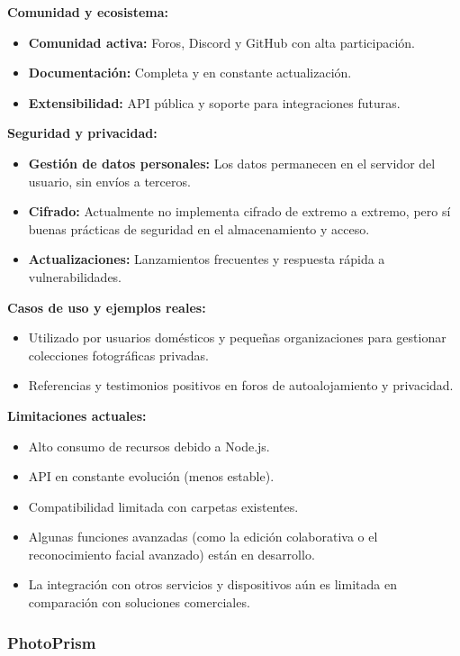 \textbf{Comunidad y ecosistema:}
\begin{itemize}
    \item \textbf{Comunidad activa:} Foros, Discord y GitHub con alta participación.
    \item \textbf{Documentación:} Completa y en constante actualización.
    \item \textbf{Extensibilidad:} API pública y soporte para integraciones futuras.
\end{itemize}

\textbf{Seguridad y privacidad:}
\begin{itemize}
    \item \textbf{Gestión de datos personales:} Los datos permanecen en el servidor del usuario, sin envíos a terceros.
    \item \textbf{Cifrado:} Actualmente no implementa cifrado de extremo a extremo, pero sí buenas prácticas de seguridad en el almacenamiento y acceso.
    \item \textbf{Actualizaciones:} Lanzamientos frecuentes y respuesta rápida a vulnerabilidades.
\end{itemize}

\textbf{Casos de uso y ejemplos reales:}
\begin{itemize}
    \item Utilizado por usuarios domésticos y pequeñas organizaciones para gestionar colecciones fotográficas privadas.
    \item Referencias y testimonios positivos en foros de autoalojamiento y privacidad.
\end{itemize}

\textbf{Limitaciones actuales:}
\begin{itemize}
    \item Alto consumo de recursos debido a Node.js.
    \item API en constante evolución (menos estable).
    \item Compatibilidad limitada con carpetas existentes.
    \item Algunas funciones avanzadas (como la edición colaborativa o el reconocimiento facial avanzado) están en desarrollo.
    \item La integración con otros servicios y dispositivos aún es limitada en comparación con soluciones comerciales.
\end{itemize}

\subsubsection{PhotoPrism}

